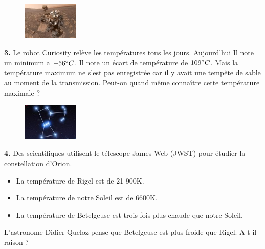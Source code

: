 \newpage

\begin{minipage}[t]{0.25\textwidth}
  \begin{figure}[H]
    \centering
    \includegraphics[width=100px]{4x2-nombres-relatifs/ex5.jpg}
  \end{figure}
\end{minipage}
\begin{minipage}[t]{0.75\textwidth}
  \textbf{3.} Le robot Curiosity relève les températures tous les jours. Aujourd'hui Il note un minimum a $-56 \degree C$. Il note un écart de température de $ 109\degree C$. Mais la température maximum ne s'est pas enregistrée car il y avait une tempête de sable au moment de la transmission. Peut-on quand même connaître cette température maximale ?\\
  \Pointilles[3]
\end{minipage}

\Pointilles[2]

\begin{minipage}[t]{0.25\textwidth}
  \begin{figure}[H]
    \centering
    \includegraphics[width=100px]{4x2-nombres-relatifs/ex7.jpg}
  \end{figure}
\end{minipage}
  \begin{minipage}[t]{0.75\textwidth}
    \textbf{4.} Des scientifiques utilisent le télescope James Web (JWST) pour étudier la constellation d'Orion.
  \begin{itemize}
    \item La température de Rigel est de 21 900K.
    \item La température de notre Soleil est de 6600K.
    \item La température de Betelgeuse est trois fois plus chaude que notre Soleil.
  \end{itemize}
  L'astronome Didier Queloz pense que Betelgeuse est plus froide que Rigel. A-t-il raison ? \\
\end{minipage}

